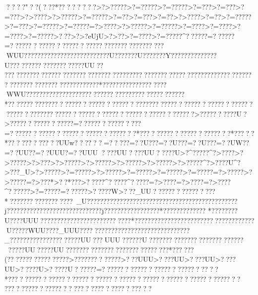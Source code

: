 {{{{{{{{{{{{{{{{{{{{{{{{{{{{{{{{{{{{{{{{{{{{{{{{{{{{{{{{{{{{{{{{{{{{{{{{{{{{{{{{{{{{{{{{{{{{{{{{{{{{{{{{{{{{{{{{{{{{{{{{{{{{{{{{{{{{{{{{{{{{{{{{{{{{{{{{{{{{{{{{{{{{{{{{{{{{{{{{{{{{{{{{{{{{{{{{{{{{{{{{{{{{{{{{{{{{{{{{{{{{{{{{{{{{{{{{{{{{{{{{{{{{{{{{{{{{{{{{{{{{{{{{{{{{{{{{{{{{{{{{{{{{{{{{{{{{{{{{{{{{{{{{{{{{{{{{{{{{{{{{{{{{{{{{{{{{{{{{{{{{{{{{{{{{{{{{{{{{{{{{{{{{{{{{{{{{{{{{{{{{{{{{{{{{{{{{{{{{{{{{{{{{{{{{{{{{{{{{{{{{{{{{{{{{{{{{{{{{{{{{{{{{{{{{{{{{{{{{{{{{{{{{{{{{{{{{{{{{{{{{{{{{{{{{{{{{{{{{{{{{{{{{{{{{{{{{{{{{{{{{{{{{{{{{{{{{{{{{{{{{{{{{{{{{{{{{{{{{{{{{{{{{{{{{{{{{{{{{{{{{{{{{{{{{{{{{{{{{{{{{{{{{{{{{{{{{{{{{{{{{{{{{{{{{{{{{{{{{{{{{{{{{{{{{{{{{{{{{{{{{{{{{{{{{{{{{{{{{{{{{{{{{{{{{{{{{{{{{{{{{{{{{{{{{{{{{{{{{{{{{{{{{{{{{{{{{{{{{{{{{{{{{{{{{{{{{{{{{{{{{{{{{{{{{{{{{{{{{{{{{{{{{{{{{{{{{{{{{{{{{{{{{{{{{{{{{{{{{{{{{{{{{{{{{{{{{{{{{{{{{{{{{{{{{{{{{{{{{{{{{{{{{{{{{{{{{{{{{{{{{{{{{{{{{{{{{{{{{{{{{{{{{{{{{{{{{{{{{{{{{{{{{{{{{{{{{{{{{{{{{{{{{{{{{{{{{{{{{{{{{{{{{{{{{{{{{{{{{{{{{{{{{{{{{{{{{{{{{{{{{{{{{{{{{{{{{{{{{{{{{{{{{{{{{{{{{{{{{{{{{{{{{{{{{{{{{{{{{{{{{{{{{{{{{{{{{{{{{{{{{{{{{{{{{{{{{{{{{{{{{{{{{{{{{{{{{{{{{{{{{{{{{{{{{{{{{{{{{{{{{{{{{{{{{{{{{{{{{{{{{{{{{{{{{{{{{{{{{{{{{{{{{{{{{{{{{{{{{{{{{{{{{{{{{{{{{{{{{{{{{{{{{{{{{{{{{{{{{{{{{{{{{{{{{{{{{{{{{{{{{{{{{{{{{{{{{{{{{{{{{{{{{{{{{{{{{{{{{{{{{{{{{{{   ??    ??"   ??(   ???*????    ??    ??    >?>?????>?=?????>?=?????>?=???>?=???>?=???>?>????>?>?????>?=?????>?=??   >?=???>?=??   >?>????>?=??   >?=?????>?=??  ?>?=?????>?=?????=?>????>?>?????>?=?????>?=????>?=????>?=????>?=?????>??   ?>?>?eUjU>?>?   ?>?=????>?=?????^??????=??????=?????????????????????????????????????????WUU??????????????????????????U???????U???????Y??????????????U?????????????????????UU??
??????????????????????????????????????????????????????????????    ???????????????????????????????????*???????????????????WWU????    ??????????????????????????????????????????*?????????????????????????????????????????????????????????????????????????????????????????????????????????????????>??????????U?>?????????????????=????????????????=????????????????????????????????*???????????????????????*????? *????  ????  ????UUw???   ???   =?????=??U???=??U???=??U???=??UW??=??UU??=??UUU?=??UUU????UU????UU?????U>?^?????^?>????>?>?????>?>??? >?>?????>?>?????>?>?????>?>?????>?>?????^?>????U^?>???_U>?>?????>?=?????>?>?????>?=?????>?=?????>?=?????=?>?????>?>?????=?>???*>??*???>?????^?????^?????=?>????=?>????=?>????^??????>?=?????=??????>?????W>???_UU????????????????*??????????????????~_U??????????????????????????????????????????????j?????????????????????????????j?????????????????*????????????? 
*????????U????UUU????    ?????   ????????????    ??????*????????????????????????????????????U?????WUU????_UUU????   ????  ?????????????????????????_?????????????????????UU???UUU??????U????????????????????????????????UU?????UU????????????????????????  ?????*?????? (?????  ?????  ?????  ??>?????????????>???UUU>????UU>????UU>????UU>?????U>?????U??????=??????????????????????????   ???*???????????????????????????????????????????????????????????
?????????????????????? ????? ?????  ????  }}}}}}}}}}}}}}}}}}}}}}}}}}}}}}}}}}}}}}}}}}}}}}}}}}}}}}}}}}}}}}}}}}}}}}}}}}}}}}}}}}}}}}}}}}}}}}}}}}}}}}}}}}}}}}}}}}}}}}}}}}}}}}}}}}}}}}}}}}}}}}}}}}}}}}}}}}}}}}}}}}}}}}}}}}}}}}}}}}}}}}}}}}}}}}}}}}}}}}}}}}}}}}}}}}}}}}}}}}}}}}}}}}}}}}}}}}}}}}}}}}}}}}}}}}}}}}}}}}}}}}}}}}}}}}}}}}}}}}}}}}}}}}}}}}}}}}}}}}}}}}}}}}}}}}}}}}}}}}}}}}}}}}}}}}}}}}}}}}}}}}}}}}}}}}}}}}}}}}}}}}}}}}}}}}}}}}}}}}}}}}}}}}}}}}}}}}}}}}}}}}}}}}}}}}}}}}}}}}}}}}}}}}}}}}}}}}}}}}}}}}}}}}}}}}}}}}}}}}}}}}}}}}}}}}}}}}}}}}}}}}}}}}}}}}}}}}}}}}}}}}}}}}}}}}}}}}}}}}}}}}}}}}}}}}}}}}}}}}}}}}}}}}}}}}}}}}}}}}}}}}}}}}}}}}}}}}}}}}}}}}}}}}}}}}}}}}}}}}}}}}}}}}}}}}}}}}}}}}}}}}}}}}}}}}}}}}}}}}}}}}}}}}}}}}}}}}}}}}}}}}}}}}}}}}}}}}}}}}}}}}}}}}}}}}}}}}}}}}}}}}}}}}}}}}}}}}}}}}}}}}}}}}}}}}}}}}}}}}}}}}}}}}}}}}}}}}}}}}}}}}}}}}}}}}}}}}}}}}}}}}}}}}}}}}}}}}}}}}}}}}}}}}}}}}}}}}}}}}}}}}}}}}}}}}}}}}}}}}}}}}}}}}}}}}}}}}}}}}}}}}}}}}}}}}}}}}}}}}}}}}}}}}}}}}}}}}}}}}}}}}}}}}}}}}}}}}}}}}}}}}}}}}}}}}}}}}}}}}}}}}}}}}}}}}}}}}}}}}}}}}}}}}}}}}}}}}}}}}}}}}}}}}}}}}}}}}}}}}}}}}}}}}}}}}}}}}}}}}}}}}}}}}}}}}}}}}}}}}}}}}}}}}}}}}}}}}}}}}}}}}}}}}}}}}}}}}}}}}}}}}}}}}}}}}}}}}}}}}}}}}}}}}}}}}}}}}}}}}}}}}}}}}}}}}}}}}}}}}}}}}}}}}}}}}}}}}}}}}}}}}}}}}}}}}}}}}}}}}}}}}}}}}}}}}}}}}}}}}}}}}}}}}}}}}}}}}}}}}}}}}}}}}}}}}}}}}}}}}}}}}}}}}}}}}}}}}}}}}}}}}}}}}}}}}}}}}}}}}}}}}}}}}}}}}}}}}}}}}}}}}}}}}
